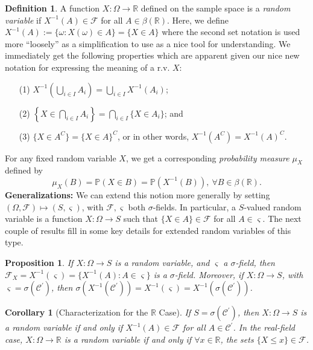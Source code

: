 \documentclass[12pt,reqno]{article}
\renewcommand{\emph}[1]{\textit{#1}}
\theoremstyle{plain}
\newtheorem{cor}[theorem]{Corollary}
\newtheorem{prop}[theorem]{Proposition}
\theoremstyle{definition}
\newtheorem{definition}[theorem]{Definition}
\newcommand{\PP}[1]{\ensuremath{\mathbb{P}\left(#1\right)}}
\begin{document}
\begin{definition} 
A function $X: \Omega \rightarrow \mathbb{R}$ defined on the sample space is a 
\emph{random variable} if $X^{-1}(A) \in \mathcal{F}$ for all $A \in \beta(\mathbb{R})$. 
Here, we define $X^{-1}(A) := \{\omega: X(\omega) \in A\} = \{X \in A\}$ where the second 
set notation is used more ``loosely'' as a simplification to use as a nice tool for 
understanding. We immediately get the following properties which are apparent given 
our nice new notation for expressing the meaning of a r.v. $X$:
\begin{itemize} 

\item[(1)] $X^{-1}\left(\bigcup_{i \in I} A_i\right) = \bigcup_{i \in I} X^{-1}(A_i)$; 
\item[(2)] $\left\{X \in \bigcap_{i \in I} A_i\right\} = \bigcap_{i \in I} \{X \in A_i\}$; and 
\item[(3)] $\{X \in A^C\} = \{X \in A\}^C$, or in other words, $X^{-1}(A^C) = X^{-1}(A)^C$. 

\end{itemize} 
For any fixed random variable $X$, we get a corresponding \emph{probability measure} 
$\mu_X$ defined by 
\[
\mu_X(B) = \PP{X \in B} = \PP{X^{-1}(B)},\ \forall B \in \beta(\mathbb{R}). 
\]
\textbf{Generalizations:} 
We can extend this notion more generally by setting $(\Omega,\mathcal{F}) \mapsto (S, \varsigma)$, with 
$\mathcal{F},\varsigma$ both $\sigma$-fields. In particular, a $S$-valued random variable is a 
function $X: \Omega \rightarrow S$ such that $\{X \in A\} \in \mathcal{F}$ for all $A \in \varsigma$. 
The next couple of results fill in some key details for extended random variables of this type. 
\end{definition} 

\begin{prop}
If $X: \Omega \rightarrow S$ is a random variable, and $\varsigma$ a $\sigma$-field, then 
$\mathcal{F}_X = X^{-1}(\varsigma) = \{X^{-1}(A): A \in \varsigma\}$ is a $\sigma$-field. 
Moreover, if $X: \Omega \rightarrow S$, with $\varsigma = \sigma(\mathcal{C}^{\prime})$, then 
$\sigma(X^{-1}(\mathcal{C}^{\prime})) = X^{-1}(\varsigma) = X^{-1}(\sigma(\mathcal{C}^{\prime}))$. 
\end{prop} 

\begin{cor}[Characterization for the $\mathbb{R}$ Case]  
If $S = \sigma(\mathcal{C}^{\prime})$, then $X: \Omega \rightarrow S$ is a random variable 
if and only if $X^{-1}(A) \in \mathcal{F}$ for all $A \in \mathcal{C}^{\prime}$. In the 
real-field case, $X: \Omega \rightarrow \mathbb{R}$ is a random variable if and only if 
$\forall x \in \mathbb{R}$, the sets $\{X \leq x\} \in \mathcal{F}$. 
\end{cor} 
\end{document}
